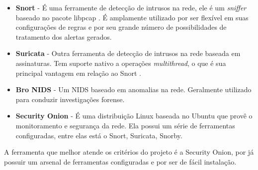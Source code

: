 			\begin{itemize}
				\item \textbf{Snort} - É uma ferramente de detecção de intrusos na rede, ele é um \textit{sniffer} baseado no pacote libpcap \cite{Martin}. É amplamente utilizado por ser flexível em suas configurações de regras e por seu grande número de possibilidades de tratamento dos alertas gerados. 
				\item \textbf{Suricata} - Outra ferramenta de detecção de intrusos na rede baseada em assinaturas. Tem suporte nativo a operações \textit{multithread}, o que é sua principal vantagem em relação ao Snort \cite{Albin}. 
				\item \textbf{Bro NIDS} - Um NIDS baseado em anomalias na rede. Geralmente utilizado para conduzir investigações forense.
				\item \textbf{Security Onion} - É uma distribuição Linux baseada no Ubuntu que provê o monitoramento e segurança da rede. Ela possui um série de ferramentas configuradas, entre elas está o Snort, Suricata, Snorby.  
			\end{itemize}

		A ferramenta que melhor atende os critérios do projeto é a Security Onion, por já possuir um arsenal de ferramentas configuradas e por ser de fácil instalação.

